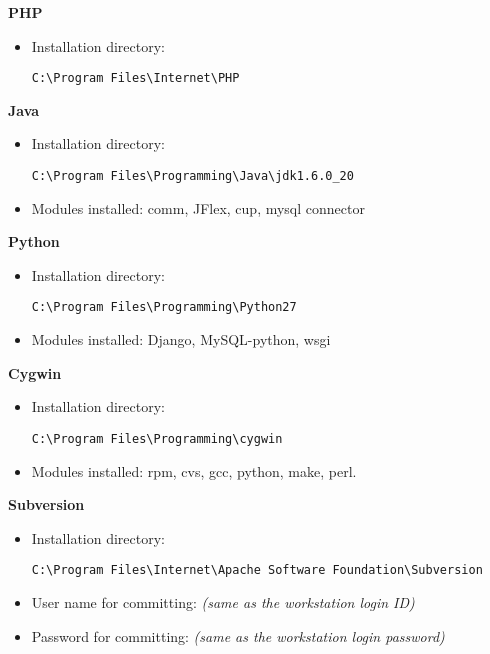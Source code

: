 \textbf{PHP}
\begin{itemize}
\item Installation directory: \begin{verbatim}C:\Program Files\Internet\PHP\end{verbatim}
\end{itemize}
\textbf{Java}
\begin{itemize}
\item Installation directory: \begin{verbatim}C:\Program Files\Programming\Java\jdk1.6.0_20\end{verbatim}
\item Modules installed: comm, JFlex, cup, mysql connector
\end{itemize}
\textbf{Python}
\begin{itemize}
\item Installation directory: \begin{verbatim}C:\Program Files\Programming\Python27\end{verbatim}
\item Modules installed: Django, MySQL-python, wsgi
\end{itemize}
\textbf{Cygwin}
\begin{itemize}
\item Installation directory: \begin{verbatim}C:\Program Files\Programming\cygwin\end{verbatim}
\item Modules installed: rpm, cvs, gcc, python, make, perl.
\end{itemize}
\textbf{Subversion}
\begin{itemize}
\item Installation directory: \begin{verbatim}C:\Program Files\Internet\Apache Software Foundation\Subversion\end{verbatim}
\item User name for committing: \emph{(same as the workstation login ID)}
\item Password for committing: \emph{(same as the workstation login password)}
\end{itemize}